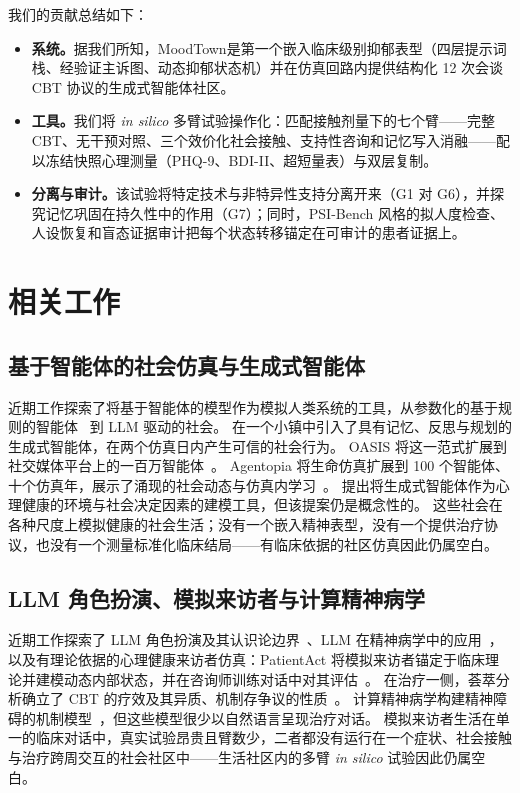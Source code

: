 \documentclass[11pt,a4paper]{article}
\newcommand{\sys}{MoodTown}
\begin{document}
我们的贡献总结如下：
\begin{itemize}
\item \textbf{系统。}据我们所知，\sys 是第一个嵌入临床级别抑郁表型（四层提示词栈、经验证主诉图、动态抑郁状态机）并在仿真回路内提供结构化 12 次会谈 CBT 协议的生成式智能体社区。
\item \textbf{工具。}我们将 \emph{in silico} 多臂试验操作化：匹配接触剂量下的七个臂——完整 CBT、无干预对照、三个效价化社会接触、支持性咨询和记忆写入消融——配以冻结快照心理测量（PHQ-9、BDI-II、超短量表）与双层复制。
\item \textbf{分离与审计。}该试验将特定技术与非特异性支持分离开来（G1 对 G6），并探究记忆巩固在持久性中的作用（G7）；同时，PSI-Bench 风格的拟人度检查、人设恢复和盲态证据审计把每个状态转移锚定在可审计的患者证据上。
\end{itemize}

\section{相关工作}\label{sec:related}

\subsection{基于智能体的社会仿真与生成式智能体}\label{sec:related-abm}

近期工作探索了将基于智能体的模型作为模拟人类系统的工具，从参数化的基于规则的智能体~\citep{bonabeau2002} 到 LLM 驱动的社会。
\citet{park2023} 在一个小镇中引入了具有记忆、反思与规划的生成式智能体，在两个仿真日内产生可信的社会行为。
OASIS 将这一范式扩展到社交媒体平台上的一百万智能体~\citep{oasis2024}。
Agentopia 将生命仿真扩展到 100 个智能体、十个仿真年，展示了涌现的社会动态与仿真内学习~\citep{agentopia2026}。
\citet{kambeitz2025} 提出将生成式智能体作为心理健康的环境与社会决定因素的建模工具，但该提案仍是概念性的。
这些社会在各种尺度上模拟健康的社会生活；没有一个嵌入精神表型，没有一个提供治疗协议，也没有一个测量标准化临床结局——有临床依据的社区仿真因此仍属空白。

\subsection{LLM 角色扮演、模拟来访者与计算精神病学}\label{sec:related-clinical}

近期工作探索了 LLM 角色扮演及其认识论边界~\citep{shanahan2023}、LLM 在精神病学中的应用~\citep{volkmer2024,stade2024}，以及有理论依据的心理健康来访者仿真：PatientAct 将模拟来访者锚定于临床理论并建模动态内部状态，并在咨询师训练对话中对其评估~\citep{patientact2026}。
在治疗一侧，荟萃分析确立了 CBT 的疗效及其异质、机制存争议的性质~\citep{cuijpers2013,hofmann2012,cuijpers2023,lambert1992}。
计算精神病学构建精神障碍的机制模型~\citep{montague2012,hauser2022,friston2023,zavlis2025}，但这些模型很少以自然语言呈现治疗对话。
模拟来访者生活在单一的临床对话中，真实试验昂贵且臂数少，二者都没有运行在一个症状、社会接触与治疗跨周交互的社会社区中——生活社区内的多臂 \emph{in silico} 试验因此仍属空白。
\end{document}
